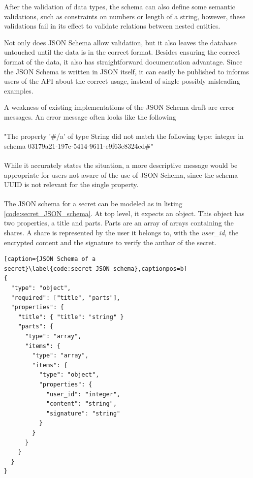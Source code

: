 After the validation of data types, the schema can also define some semantic
validations, such as constraints on numbers or length of a string, however,
these validations fail in its effect to validate relations between nested
entities.

Not only does JSON Schema allow validation, but it also leaves the database
untouched until the data is in the correct format. Besides ensuring the correct
format of the data, it also has straightforward documentation advantage. Since
the JSON Schema is written in JSON itself, it can easily be published to
informs users of the API about the correct usage, instead of single possibly
misleading examples.

A weakness of existing implementations of the JSON Schema draft are error
messages. An error message often looks like the following

\paragraph{}{"The property '\#/a' of type String did not match the following type: integer in
schema 03179a21-197e-5414-9611-e9f63e8324cd\#"}

\paragraph{}{While it accurately states the situation, a more descriptive message would be
appropriate for users not aware of the use of JSON Schema, since the schema
UUID is not relevant for the single property.}

\paragraph{}{ 
  
  The JSON schema for a secret can be modeled as in listing
  \ref{code:secret_JSON_schema}. At top level, it expects an object. This
  object has two properties, a title and parts. Parts are an array of arrays
  containing the shares. A share is represented by the user it belongs to, with
  the \textit{user\_id}, the encrypted content and the signature to verify the
  author of the secret.

}

\begin{lstlisting}[caption={JSON Schema of a secret}\label{code:secret_JSON_schema},captionpos=b]
{
  "type": "object",
  "required": ["title", "parts"],
  "properties": {
    "title": { "title": "string" }
    "parts": {
      "type": "array",
      "items": {
        "type": "array",
        "items": {
          "type": "object",
          "properties": {
            "user_id": "integer",
            "content": "string",
            "signature": "string"
          }
        }
      }
    }
  }
}
\end{lstlisting}

